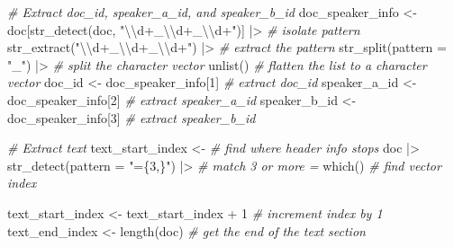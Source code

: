 \documentclass[
  letterpaper,
  DIV=11,
  numbers=noendperiod]{scrreport}
\newenvironment{Shaded}{\begin{snugshade}}{\end{snugshade}}
\newcommand{\AttributeTok}[1]{\textcolor[rgb]{0.00,0.00,0.00}{#1}}
\newcommand{\CommentTok}[1]{\textcolor[rgb]{0.00,0.00,0.00}{\textit{#1}}}
\newcommand{\DecValTok}[1]{\textcolor[rgb]{0.00,0.00,0.00}{#1}}
\newcommand{\FunctionTok}[1]{\textcolor[rgb]{0.00,0.00,0.00}{#1}}
\newcommand{\NormalTok}[1]{\textcolor[rgb]{0.00,0.00,0.00}{#1}}
\newcommand{\OtherTok}[1]{\textcolor[rgb]{0.00,0.00,0.00}{#1}}
\newcommand{\SpecialCharTok}[1]{\textcolor[rgb]{0.00,0.00,0.00}{#1}}
\newcommand{\StringTok}[1]{\textcolor[rgb]{0.00,0.00,0.00}{#1}}
\theoremstyle{definition}
\theoremstyle{remark}
\begin{document}
\begin{Shaded}
\begin{Highlighting}[]
  \CommentTok{\# Extract \textasciigrave{}doc\_id\textasciigrave{}, \textasciigrave{}speaker\_a\_id\textasciigrave{}, and \textasciigrave{}speaker\_b\_id\textasciigrave{}}
\NormalTok{  doc\_speaker\_info }\OtherTok{\textless{}{-}} 
\NormalTok{    doc[}\FunctionTok{str\_detect}\NormalTok{(doc, }\StringTok{"}\SpecialCharTok{\textbackslash{}\textbackslash{}}\StringTok{d+\_}\SpecialCharTok{\textbackslash{}\textbackslash{}}\StringTok{d+\_}\SpecialCharTok{\textbackslash{}\textbackslash{}}\StringTok{d+"}\NormalTok{)] }\SpecialCharTok{|\textgreater{}} \CommentTok{\# isolate pattern}
    \FunctionTok{str\_extract}\NormalTok{(}\StringTok{"}\SpecialCharTok{\textbackslash{}\textbackslash{}}\StringTok{d+\_}\SpecialCharTok{\textbackslash{}\textbackslash{}}\StringTok{d+\_}\SpecialCharTok{\textbackslash{}\textbackslash{}}\StringTok{d+"}\NormalTok{) }\SpecialCharTok{|\textgreater{}} \CommentTok{\# extract the pattern}
    \FunctionTok{str\_split}\NormalTok{(}\AttributeTok{pattern =} \StringTok{"\_"}\NormalTok{) }\SpecialCharTok{|\textgreater{}} \CommentTok{\# split the character vector}
    \FunctionTok{unlist}\NormalTok{() }\CommentTok{\# flatten the list to a character vector}
\NormalTok{  doc\_id }\OtherTok{\textless{}{-}}\NormalTok{ doc\_speaker\_info[}\DecValTok{1}\NormalTok{] }\CommentTok{\# extract \textasciigrave{}doc\_id\textasciigrave{}}
\NormalTok{  speaker\_a\_id }\OtherTok{\textless{}{-}}\NormalTok{ doc\_speaker\_info[}\DecValTok{2}\NormalTok{] }\CommentTok{\# extract \textasciigrave{}speaker\_a\_id\textasciigrave{}}
\NormalTok{  speaker\_b\_id }\OtherTok{\textless{}{-}}\NormalTok{ doc\_speaker\_info[}\DecValTok{3}\NormalTok{] }\CommentTok{\# extract \textasciigrave{}speaker\_b\_id\textasciigrave{}}
  
  \CommentTok{\# Extract \textasciigrave{}text\textasciigrave{}}
\NormalTok{  text\_start\_index }\OtherTok{\textless{}{-}} \CommentTok{\# find where header info stops}
\NormalTok{    doc }\SpecialCharTok{|\textgreater{}} 
    \FunctionTok{str\_detect}\NormalTok{(}\AttributeTok{pattern =} \StringTok{"=\{3,\}"}\NormalTok{) }\SpecialCharTok{|\textgreater{}} \CommentTok{\# match 3 or more \textasciigrave{}=\textasciigrave{}}
    \FunctionTok{which}\NormalTok{() }\CommentTok{\# find vector index}
  
\NormalTok{  text\_start\_index }\OtherTok{\textless{}{-}}\NormalTok{ text\_start\_index }\SpecialCharTok{+} \DecValTok{1} \CommentTok{\# increment index by 1}
\NormalTok{  text\_end\_index }\OtherTok{\textless{}{-}} \FunctionTok{length}\NormalTok{(doc) }\CommentTok{\# get the end of the text section}
  

\end{Highlighting}
\end{Shaded}
\end{document}
